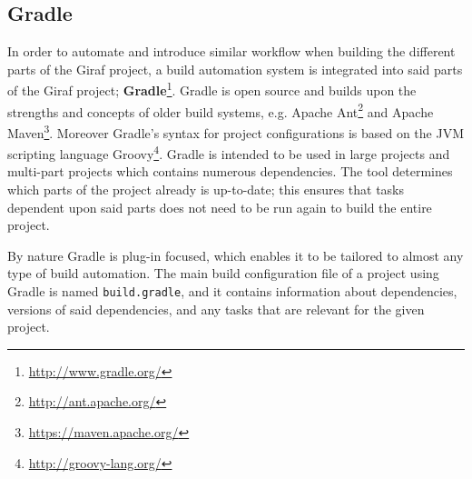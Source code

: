 \subsection*{Gradle}\label{subsec:gradle}
In order to automate and introduce similar workflow when building the different parts of the Giraf project, a build automation system is integrated into said parts of the Giraf project; \textbf{Gradle}\footnote{\url{http://www.gradle.org/}}.
Gradle is open source and builds upon the strengths and concepts of older build systems, e.g. Apache Ant\footnote{\url{http://ant.apache.org/}} and Apache Maven\footnote{\url{https://maven.apache.org/}}.
Moreover Gradle's syntax for project configurations is based on the JVM scripting language Groovy\footnote{\url{http://groovy-lang.org/}}.
Gradle is intended to be used in large projects and multi-part projects which contains numerous dependencies.
The tool determines which parts of the project already is up-to-date; this ensures that tasks dependent upon said parts does not need to be run again to build the entire project. 

By nature Gradle is plug-in focused, which enables it to be tailored to almost any type of build automation.
The main build configuration file of a project using Gradle is named \texttt{build.gradle}, and it contains information about dependencies, versions of said dependencies, and any tasks that are relevant for the given project.

